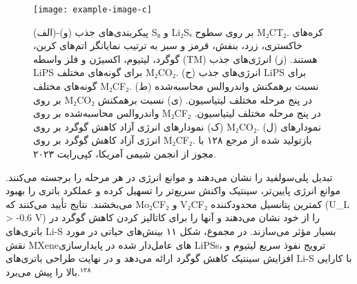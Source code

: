 \documentclass[12pt,a4paper,twocolumn]{article} %
\newcommand{\persian}[1]{\textfarsi{#1}}
\newcommand{\english}[1]{\textenglish{#1}}
\newcommand{\farsibold}[1]{{\farsifontbold{#1}}}
\begin{document}
\begin{figure*}[t]
    \centering
    \texttt{[image: example-image-c]} %
    \caption{\persian{
    \farsibold{شکل ۱۱.} (الف)-(و) پیکربندی‌های جذب \english{S₈} و \english{Li₂Sₓ} بر روی سطوح \english{M₂CT₂}. کره‌های خاکستری، زرد، بنفش، قرمز و سبز به ترتیب نمایانگر اتم‌های کربن، گوگرد، لیتیوم، اکسیژن و فلز واسطه (\english{TM}) هستند. (ز) انرژی‌های جذب \english{LiPS} برای گونه‌های مختلف \english{M₂CO₂}. (ح) انرژی‌های جذب \english{LiPS} برای گونه‌های مختلف \english{M₂CF₂}. (ط) نسبت برهمکنش واندروالس محاسبه‌شده بر روی \english{M₂CO₂} در پنج مرحله مختلف لیتیاسیون. (ی) نسبت برهمکنش واندروالس محاسبه‌شده بر روی \english{M₂CF₂} در پنج مرحله مختلف لیتیاسیون. (ک) نمودارهای انرژی آزاد کاهش گوگرد بر روی \english{M₂CO₂}. (ل) نمودارهای انرژی آزاد کاهش گوگرد بر روی \english{M₂CF₂}. بازتولید شده از مرجع ۱۲۸ با مجوز از انجمن شیمی آمریکا، کپی‌رایت ۲۰۲۳.
    }}
    \label{fig:11}
\end{figure*}


\persian{
تبدیل پلی‌سولفید را نشان می‌دهند و موانع انرژی در هر مرحله را برجسته می‌کنند. موانع انرژی پایین‌تر، سینتیک واکنش سریع‌تر را تسهیل کرده و عملکرد باتری را بهبود می‌بخشند. نتایج تأیید می‌کنند که \english{Mo₂CF₂} و \english{V₂CF₂} کمترین پتانسیل محدودکننده (\english{U_L > -0.6 V}) را از خود نشان می‌دهند و آنها را برای کاتالیز کردن کاهش گوگرد در باتری‌های \english{Li-S} بسیار مؤثر می‌سازند. در مجموع، شکل ۱۱ بینش‌های حیاتی در مورد نقش \english{MXene}های عامل‌دار شده در پایدارسازی \english{LiPSs}، ترویج نفوذ سریع لیتیوم و افزایش سینتیک کاهش گوگرد ارائه می‌دهد و در نهایت طراحی باتری‌های \english{Li-S} با کارایی بالا را پیش می‌برد.$^{۱۲۸}$
}
\end{document}

